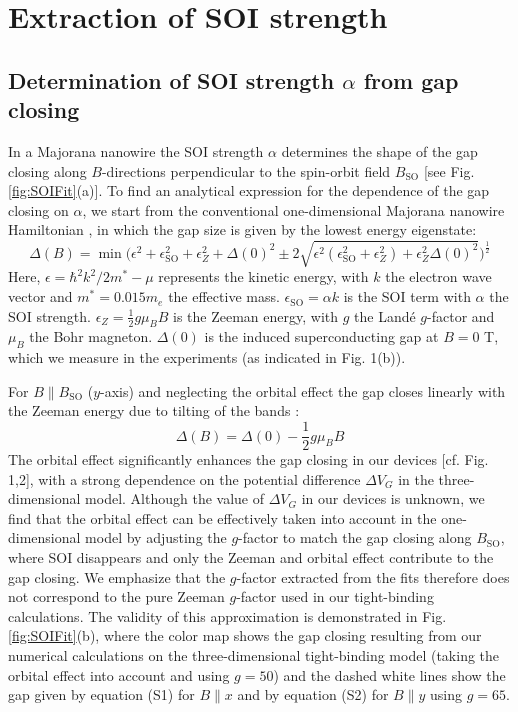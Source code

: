 \documentclass[prl,singlecolumn,notitlepage,secnumroman,superscriptaddress,nobibnotes,graphicx,amsmath,amssymb]{revtex4-2}
\begin{document}
\newpage
\section{Extraction of SOI strength}
\subsection{Determination of SOI strength $\alpha$ from gap closing}
In a Majorana nanowire the SOI strength $\alpha$ determines the shape of the gap closing along $B$-directions perpendicular to the spin-orbit field $B_{\mathrm{SO}}$ \cite{VanHeck,Pan2018} [see Fig. \ref{fig:SOIFit}(a)]. To find an analytical expression for the dependence of the gap closing on $\alpha$, we start from the conventional one-dimensional Majorana nanowire Hamiltonian \cite{Lutchyn2010,Oreg2010}, in which the gap size is given by the lowest energy eigenstate:
\begin{equation}
\Delta(B) = \min \bigg( \epsilon^2 + \epsilon_{\mathrm{SO}}^2 + \epsilon_{Z}^2 + \Delta(0)^2 \pm 2 \sqrt{\epsilon^2 ( \epsilon_{\mathrm{SO}}^2+\epsilon_{Z}^2 ) + \epsilon_{Z}^2\Delta(0)^2} \bigg)^\frac{1}{2}
\end{equation}
Here, $\epsilon=\hbar^2k^2/2m^*-\mu$ represents the kinetic energy, with $k$ the electron wave vector and $m^*=0.015 m_e$ the effective mass. $\epsilon_{\mathrm{SO}}=\alpha k$ is the SOI term with $\alpha$ the SOI strength. $\epsilon_Z = \frac{1}{2}g\mu_BB$ is the Zeeman energy, with $g$ the Land\'e $g$-factor and $\mu_B$ the Bohr magneton. $\Delta(0)$ is the induced superconducting gap at $B = 0$ T, which we measure in the experiments (as indicated in Fig. 1(b)).

For $B \parallel B_{\mathrm{SO}}$ ($y$-axis) and neglecting the orbital effect the gap closes linearly with the Zeeman energy due to tilting of the bands \cite{Osca2014,Rex2014}: 
\begin{equation}
\Delta(B) = \Delta(0) - \frac{1}{2}g\mu_BB
\end{equation}
The orbital effect significantly enhances the gap closing in our devices [cf. Fig. 1,2], with a  strong dependence on the potential difference $\Delta V_G$ in the three-dimensional model. Although the value of $\Delta V_G$ in our devices is unknown, we find that the orbital effect can be effectively taken into account in the one-dimensional model by adjusting the $g$-factor to match the gap closing along $B_{\mathrm{SO}}$, where SOI disappears and only the Zeeman and orbital effect contribute to the gap closing. We emphasize that the $g$-factor extracted from the fits therefore does not correspond to the pure Zeeman $g$-factor used in our tight-binding calculations. The validity of this approximation is demonstrated in Fig. \ref{fig:SOIFit}(b), where the color map shows the gap closing resulting from our numerical calculations on the three-dimensional tight-binding model (taking the orbital effect into account and using $g = 50$) and the dashed white lines show the gap given by equation (S1) for $B\parallel x$ and by equation (S2) for $B\parallel y$ using $g=65$.
\end{document}
